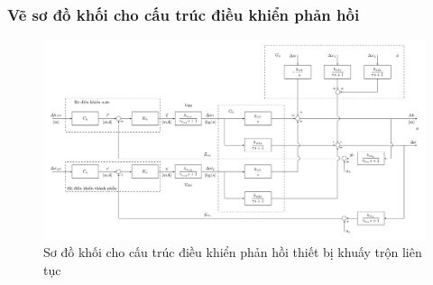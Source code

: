 \subsubsection{Vẽ sơ đồ khối cho cấu trúc điều khiển phản hồi}
    \begin{landscape}
        \begin{figure}[htp]
            \begin{center}
                \includegraphics[scale=0.93]{section/mohinhhoalythuyet/images/binhchuachatlong-khuaytron-mohinh1-sodokhoi-cautrucdieukhienphanhoi}
            \end{center}
            \caption{Sơ đồ khối cho cấu trúc điều khiển phản hồi thiết bị khuấy trộn liên tục} \label{Fig:binhchuachatlong-khuaytron-sodokhoi-dieukhienphanhoi}
        \end{figure}
    \end{landscape}
